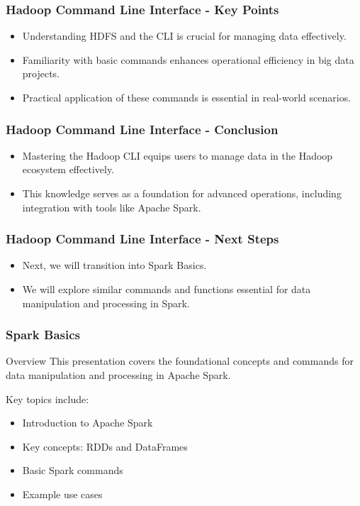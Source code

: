\documentclass[aspectratio=169]{beamer}
\begin{document}
\begin{frame}[fragile]
    \frametitle{Hadoop Command Line Interface - Key Points}
    \begin{itemize}
        \item Understanding HDFS and the CLI is crucial for managing data effectively.
        \item Familiarity with basic commands enhances operational efficiency in big data projects.
        \item Practical application of these commands is essential in real-world scenarios.
    \end{itemize}
\end{frame}

\begin{frame}[fragile]
    \frametitle{Hadoop Command Line Interface - Conclusion}
    \begin{itemize}
        \item Mastering the Hadoop CLI equips users to manage data in the Hadoop ecosystem effectively.
        \item This knowledge serves as a foundation for advanced operations, including integration with tools like Apache Spark.
    \end{itemize}
\end{frame}

\begin{frame}[fragile]
    \frametitle{Hadoop Command Line Interface - Next Steps}
    \begin{itemize}
        \item Next, we will transition into Spark Basics.
        \item We will explore similar commands and functions essential for data manipulation and processing in Spark.
    \end{itemize}
\end{frame}

\begin{frame}
    \frametitle{Spark Basics}
    \begin{block}{Overview}
        This presentation covers the foundational concepts and commands for data manipulation and processing in Apache Spark.
        
        Key topics include:
        \begin{itemize}
            \item Introduction to Apache Spark
            \item Key concepts: RDDs and DataFrames
            \item Basic Spark commands
            \item Example use cases
        \end{itemize}
    \end{block}
\end{frame}
\end{document}
